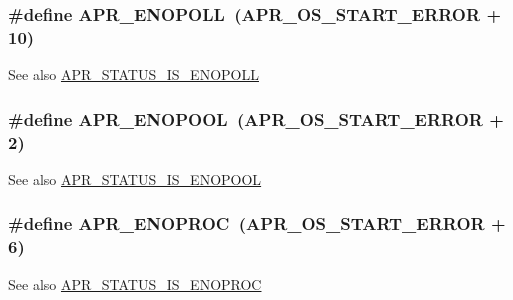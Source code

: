 \subsubsection[{\texorpdfstring{A\+P\+R\+\_\+\+E\+N\+O\+P\+O\+LL}{APR_ENOPOLL}}]{\setlength{\rightskip}{0pt plus 5cm}\#define A\+P\+R\+\_\+\+E\+N\+O\+P\+O\+LL~({\bf A\+P\+R\+\_\+\+O\+S\+\_\+\+S\+T\+A\+R\+T\+\_\+\+E\+R\+R\+OR} + 10)}\hypertarget{group___a_p_r___error_gaeff8d4ed7bf9b99cbe62a3e7068e85b7}{}\label{group___a_p_r___error_gaeff8d4ed7bf9b99cbe62a3e7068e85b7}
\begin{DoxySeeAlso}{See also}
\hyperlink{group___a_p_r___s_t_a_t_u_s___i_s_ga0534b566ee6e101399266cf97b7c9f5d}{A\+P\+R\+\_\+\+S\+T\+A\+T\+U\+S\+\_\+\+I\+S\+\_\+\+E\+N\+O\+P\+O\+LL} 
\end{DoxySeeAlso}
\subsubsection[{\texorpdfstring{A\+P\+R\+\_\+\+E\+N\+O\+P\+O\+OL}{APR_ENOPOOL}}]{\setlength{\rightskip}{0pt plus 5cm}\#define A\+P\+R\+\_\+\+E\+N\+O\+P\+O\+OL~({\bf A\+P\+R\+\_\+\+O\+S\+\_\+\+S\+T\+A\+R\+T\+\_\+\+E\+R\+R\+OR} + 2)}\hypertarget{group___a_p_r___error_gaa8461873202e5e0b4c0ea261e05b07a9}{}\label{group___a_p_r___error_gaa8461873202e5e0b4c0ea261e05b07a9}
\begin{DoxySeeAlso}{See also}
\hyperlink{group___a_p_r___s_t_a_t_u_s___i_s_gada4306243ac7bb7f8dce01765a660bf6}{A\+P\+R\+\_\+\+S\+T\+A\+T\+U\+S\+\_\+\+I\+S\+\_\+\+E\+N\+O\+P\+O\+OL} 
\end{DoxySeeAlso}
\subsubsection[{\texorpdfstring{A\+P\+R\+\_\+\+E\+N\+O\+P\+R\+OC}{APR_ENOPROC}}]{\setlength{\rightskip}{0pt plus 5cm}\#define A\+P\+R\+\_\+\+E\+N\+O\+P\+R\+OC~({\bf A\+P\+R\+\_\+\+O\+S\+\_\+\+S\+T\+A\+R\+T\+\_\+\+E\+R\+R\+OR} + 6)}\hypertarget{group___a_p_r___error_ga18aa6d4ebaefda39478649c20bbeb9df}{}\label{group___a_p_r___error_ga18aa6d4ebaefda39478649c20bbeb9df}
\begin{DoxySeeAlso}{See also}
\hyperlink{group___a_p_r___s_t_a_t_u_s___i_s_ga08394d8e2ebaa1a8de0be315783181ba}{A\+P\+R\+\_\+\+S\+T\+A\+T\+U\+S\+\_\+\+I\+S\+\_\+\+E\+N\+O\+P\+R\+OC} 
\end{DoxySeeAlso}
